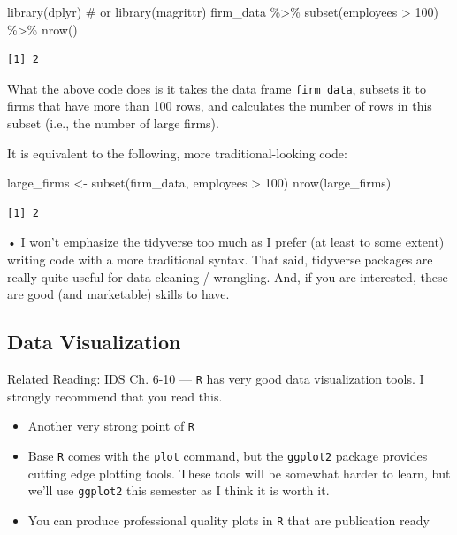 \documentclass[
  letterpaper,
  DIV=11,
  numbers=noendperiod]{scrreprt}
\newenvironment{Shaded}{\begin{snugshade}}{\end{snugshade}}
\newcommand{\CommentTok}[1]{\textcolor[rgb]{0.37,0.37,0.37}{#1}}
\newcommand{\DecValTok}[1]{\textcolor[rgb]{0.68,0.00,0.00}{#1}}
\newcommand{\FunctionTok}[1]{\textcolor[rgb]{0.28,0.35,0.67}{#1}}
\newcommand{\NormalTok}[1]{\textcolor[rgb]{0.00,0.23,0.31}{#1}}
\newcommand{\OtherTok}[1]{\textcolor[rgb]{0.00,0.23,0.31}{#1}}
\newcommand{\SpecialCharTok}[1]{\textcolor[rgb]{0.37,0.37,0.37}{#1}}
\begin{document}
\begin{Shaded}
\begin{Highlighting}[]
\FunctionTok{library}\NormalTok{(dplyr) }\CommentTok{\# or library(magrittr)}
\NormalTok{firm\_data }\SpecialCharTok{\%\textgreater{}\%}
  \FunctionTok{subset}\NormalTok{(employees }\SpecialCharTok{\textgreater{}} \DecValTok{100}\NormalTok{) }\SpecialCharTok{\%\textgreater{}\%}
  \FunctionTok{nrow}\NormalTok{()}
\end{Highlighting}
\end{Shaded}

\begin{verbatim}
[1] 2
\end{verbatim}

What the above code does is it takes the data frame \texttt{firm\_data},
subsets it to firms that have more than 100 rows, and calculates the
number of rows in this subset (i.e., the number of large firms).

It is equivalent to the following, more traditional-looking code:

\begin{Shaded}
\begin{Highlighting}[]
\NormalTok{large\_firms }\OtherTok{\textless{}{-}} \FunctionTok{subset}\NormalTok{(firm\_data, employees }\SpecialCharTok{\textgreater{}} \DecValTok{100}\NormalTok{)}
\FunctionTok{nrow}\NormalTok{(large\_firms)}
\end{Highlighting}
\end{Shaded}

\begin{verbatim}
[1] 2
\end{verbatim}

• I won't emphasize the tidyverse too much as I prefer (at least to some
extent) writing code with a more traditional syntax. That said,
tidyverse packages are really quite useful for data cleaning /
wrangling. And, if you are interested, these are good (and marketable)
skills to have.

\subsection{Data Visualization}\label{data-visualization}

Related Reading: IDS Ch. 6-10 --- \texttt{R} has very good data
visualization tools. I strongly recommend that you read this.

\begin{itemize}
\item
  Another very strong point of \texttt{R}
\item
  Base \texttt{R} comes with the \texttt{plot} command, but the
  \texttt{ggplot2} package provides cutting edge plotting tools. These
  tools will be somewhat harder to learn, but we'll use \texttt{ggplot2}
  this semester as I think it is worth it.
\item
  You can produce professional quality plots in \texttt{R} that are
  publication ready
\end{itemize}
\end{document}
